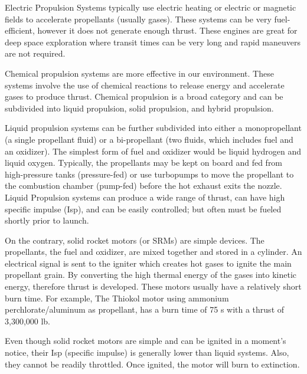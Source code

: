Electric Propulsion Systems typically use electric heating or electric
or magnetic fields to accelerate propellants (usually gases).  These
systems can be very fuel-efficient, however it does not generate
enough thrust. These engines are great for deep space exploration
where transit times can be very long and rapid maneuvers are not
required\cite{qp8}.

Chemical propulsion systems are  more effective in our
environment. These systems involve the use of chemical reactions to
release energy and accelerate gases to produce thrust. Chemical
propulsion is a broad category and can be subdivided into liquid
propulsion, solid propulsion, and hybrid propulsion.

Liquid propulsion systems can be further subdivided into either a
monopropellant (a single propellant fluid) or a bi-propellant (two
fluids, which includes fuel and an oxidizer). The simplest form of
fuel and oxidizer would be liquid hydrogen and liquid
oxygen. Typically, the propellants may be kept on board and fed from
high-pressure tanks (pressure-fed) or use turbopumps to move the
propellant to the combustion  chamber (pump-fed) before the hot
exhaust exits the nozzle. Liquid Propulsion systems can produce a wide
range of thrust, can have high specific impulse (Isp), and can be
easily controlled; but often must be fueled shortly prior to launch.

On the contrary, solid rocket motors (or SRMs) are simple devices. The
propellants, the fuel and oxidizer, are mixed together and stored in a
cylinder. An electrical signal is sent to the igniter which creates
hot gases to ignite the main propellant grain. By converting the high
thermal energy of the gases into kinetic energy, therefore thrust is
developed. These motors usually have a relatively short burn time. For
example, The Thiokol motor using ammonium perchlorate/aluminum as
propellant, has a burn time of 75 s with a thrust of 3,300,000 lb.

Even though solid rocket motors are simple and can be ignited in a
moment's notice, their Isp  (specific impulse) is generally lower than
liquid systems. Also, they cannot be readily throttled. Once ignited,
the motor will burn to extinction\cite{qp9}. 

